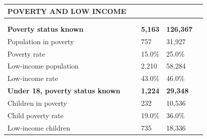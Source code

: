 \documentclass[9pt]{report}
\begin{document}
\vspace{12pt}
\setlength{\tabcolsep}{.01in} %
\begin{tabular}{p{.10in}p{.10in}p{.10in}p{3.7in}>{\hfill}p{.85in}>{\hfill}p{.85in}>{\hfill}p{.85in}>{\hfill}p{.85in}p{0.1in}}
\multicolumn{9}{l}{\parbox{7.1in}{\raggedright{\large{\strut\textbf{POVERTY AND LOW INCOME}\strut}}}} \\ 
\hline
\multicolumn{4}{l}{\parbox{3.5in}{\raggedright{\textbf{}}}} & \multicolumn{1}{r}{\parbox{.85in}{\strut\raggedleft{\textbf{}\strut}}} & \multicolumn{1}{r}{\parbox{.85in}{\strut\raggedleft{\textbf{}\strut}}} & \multicolumn{1}{r}{\parbox{.85in}{\strut{}}} & \multicolumn{1}{r}{\parbox{.85in}{\strut{}}} & \\ 
\multicolumn{9}{l}{} \\ 
\multicolumn{4}{l}{\parbox{3.5in}{\strut\raggedright{\textbf{Poverty status known}\strut}}} & \textbf{} & \textbf{} & \textbf{5,163} & \textbf{126,367} & \textbf{} \\ 
\multicolumn{4}{l}{\parbox{3.6in}{\strut\raggedright{{Population in poverty}}\strut}} &  &  & 757 & 31,927 & \multicolumn{1}{l}{}  \\ 
\multicolumn{4}{l}{\parbox{3.6in}{\strut\raggedright{{Poverty rate}}\strut}} &  &  & 15.0\% & 25.0\% & \multicolumn{1}{l}{}  \\ 
\multicolumn{4}{l}{\parbox{3.6in}{\strut\raggedright{{Low-income population}}\strut}} &  &  & 2,210 & 58,284 & \multicolumn{1}{l}{}  \\ 
\multicolumn{4}{l}{\parbox{3.6in}{\strut\raggedright{{Low-income rate}}\strut}} &  &  & 43.0\% & 46.0\% & \multicolumn{1}{l}{}  \\ 
\multicolumn{4}{l}{\parbox{3.5in}{\strut\raggedright{\textbf{Under 18, poverty status known}\strut}}} & \textbf{} & \textbf{} & \textbf{1,224} & \textbf{29,348} & \textbf{} \\ 
\multicolumn{4}{l}{\parbox{3.6in}{\strut\raggedright{{Children in poverty}}\strut}} &  &  & 232 & 10,536 & \multicolumn{1}{l}{}  \\ 
\multicolumn{4}{l}{\parbox{3.6in}{\strut\raggedright{{Child poverty rate}}\strut}} &  &  & 19.0\% & 36.0\% & \multicolumn{1}{l}{}  \\ 
\multicolumn{4}{l}{\parbox{3.6in}{\strut\raggedright{{Low-income children}}\strut}} &  &  & 735 & 18,336 & \multicolumn{1}{l}{}  \\ 

\end{tabular}
\end{document}
